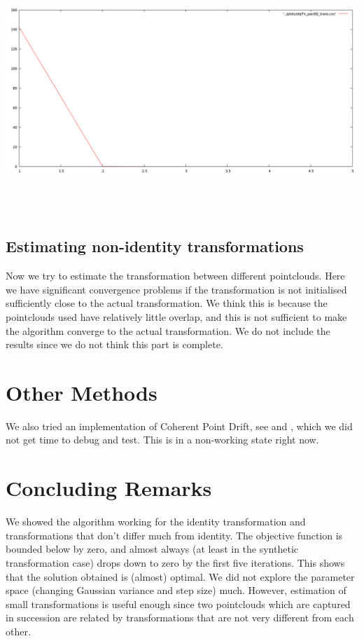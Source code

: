 \documentclass[11pt, a4paper]{article}
\begin{document}
\centerline{\includegraphics[scale=0.35]{objFn_pair00_trans}} \\ \\

\subsection{Estimating non-identity transformations}
Now we try to estimate the transformation between different pointclouds. Here we have significant convergence problems if the transformation is not initialised sufficiently close to the actual transformation. We think this is because the pointclouds used have relatively little overlap, and this is not sufficient to make the algorithm converge to the actual transformation. We do not include the results since we do not think this part is complete.

\section{Other Methods}
We also tried an implementation of Coherent Point Drift, see \cite{cpd} and \cite{wiki}, which we did not get time to debug and test. This is in a non-working state right now.

\section{Concluding Remarks}
We showed the algorithm working for the identity transformation and transformations that don't differ much from identity. The objective function is bounded below by zero, and almost always (at least in the synthetic transformation case) drops down to zero by the first five iterations. This shows that the solution obtained is (almost) optimal. We did not explore the parameter space (changing Gaussian variance and step size) much. However, estimation of small transformations is useful enough since two pointclouds which are captured in succession are related by transformations that are not very different from each other.
\end{document}
